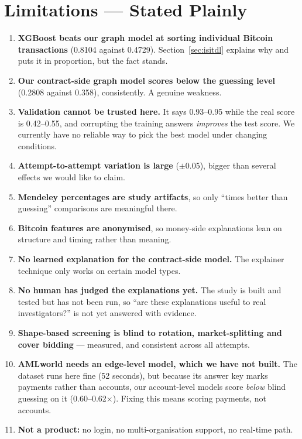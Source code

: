 \documentclass[11pt,a4paper]{article}
\begin{document}
\section{Limitations --- Stated Plainly}
\label{sec:limits}

\begin{enumerate}
  \item \textbf{XGBoost beats our graph model at sorting individual Bitcoin
        transactions} (0.8104 against 0.4729). Section~\ref{sec:isitdl} explains
        why and puts it in proportion, but the fact stands.
  \item \textbf{Our contract-side graph model scores below the guessing level}
        (0.2808 against 0.358), consistently. A genuine weakness.
  \item \textbf{Validation cannot be trusted here.} It says 0.93--0.95 while the
        real score is 0.42--0.55, and corrupting the training answers
        \emph{improves} the test score. We currently have no reliable way to pick
        the best model under changing conditions.
  \item \textbf{Attempt-to-attempt variation is large} ($\pm$0.05), bigger than
        several effects we would like to claim.
  \item \textbf{Mendeley percentages are study artifacts}, so only
        ``times better than guessing'' comparisons are meaningful there.
  \item \textbf{Bitcoin features are anonymised}, so money-side explanations lean
        on structure and timing rather than meaning.
  \item \textbf{No learned explanation for the contract-side model.} The explainer
        technique only works on certain model types.
  \item \textbf{No human has judged the explanations yet.} The study is built and
        tested but has not been run, so ``are these explanations useful to real
        investigators?'' is not yet answered with evidence.
  \item \textbf{Shape-based screening is blind to rotation, market-splitting and
        cover bidding} --- measured, and consistent across all attempts.
  \item \textbf{AMLworld needs an edge-level model, which we have not built.}
        The dataset runs here fine (52 seconds), but because its answer key
        marks payments rather than accounts, our account-level models score
        \emph{below} blind guessing on it (0.60--0.62$\times$). Fixing this
        means scoring payments, not accounts.
  \item \textbf{Not a product:} no login, no multi-organisation support, no
        real-time path.
\end{enumerate}
\end{document}
